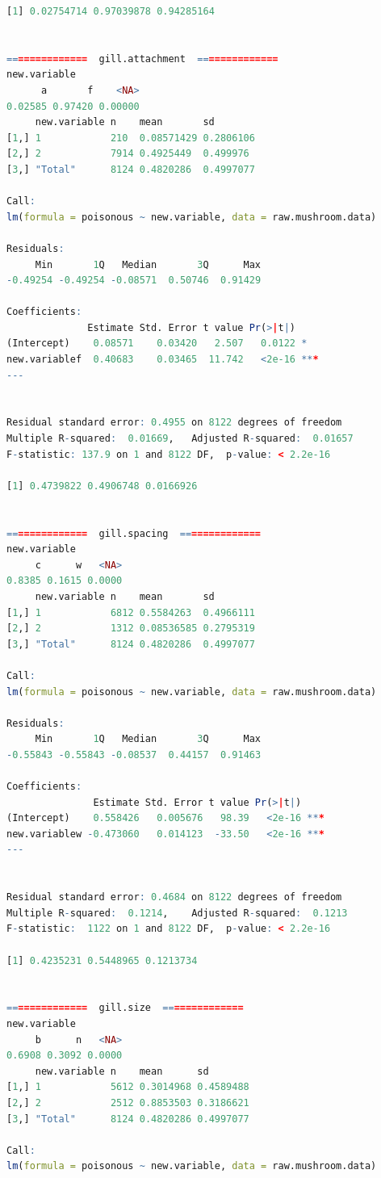 \documentclass[12pt]{article}
\begin{document}
\begin{lstlisting}[language = R]
[1] 0.02754714 0.97039878 0.94285164


==============  gill.attachment  ==============
new.variable
      a       f    <NA> 
0.02585 0.97420 0.00000 
     new.variable n    mean       sd       
[1,] 1            210  0.08571429 0.2806106
[2,] 2            7914 0.4925449  0.499976 
[3,] "Total"      8124 0.4820286  0.4997077

Call:
lm(formula = poisonous ~ new.variable, data = raw.mushroom.data)

Residuals:
     Min       1Q   Median       3Q      Max 
-0.49254 -0.49254 -0.08571  0.50746  0.91429 

Coefficients:
              Estimate Std. Error t value Pr(>|t|)    
(Intercept)    0.08571    0.03420   2.507   0.0122 *  
new.variablef  0.40683    0.03465  11.742   <2e-16 ***
---


Residual standard error: 0.4955 on 8122 degrees of freedom
Multiple R-squared:  0.01669,	Adjusted R-squared:  0.01657 
F-statistic: 137.9 on 1 and 8122 DF,  p-value: < 2.2e-16

[1] 0.4739822 0.4906748 0.0166926


==============  gill.spacing  ==============
new.variable
     c      w   <NA> 
0.8385 0.1615 0.0000 
     new.variable n    mean       sd       
[1,] 1            6812 0.5584263  0.4966111
[2,] 2            1312 0.08536585 0.2795319
[3,] "Total"      8124 0.4820286  0.4997077

Call:
lm(formula = poisonous ~ new.variable, data = raw.mushroom.data)

Residuals:
     Min       1Q   Median       3Q      Max 
-0.55843 -0.55843 -0.08537  0.44157  0.91463 

Coefficients:
               Estimate Std. Error t value Pr(>|t|)    
(Intercept)    0.558426   0.005676   98.39   <2e-16 ***
new.variablew -0.473060   0.014123  -33.50   <2e-16 ***
---


Residual standard error: 0.4684 on 8122 degrees of freedom
Multiple R-squared:  0.1214,	Adjusted R-squared:  0.1213 
F-statistic:  1122 on 1 and 8122 DF,  p-value: < 2.2e-16

[1] 0.4235231 0.5448965 0.1213734


==============  gill.size  ==============
new.variable
     b      n   <NA> 
0.6908 0.3092 0.0000 
     new.variable n    mean      sd       
[1,] 1            5612 0.3014968 0.4589488
[2,] 2            2512 0.8853503 0.3186621
[3,] "Total"      8124 0.4820286 0.4997077

Call:
lm(formula = poisonous ~ new.variable, data = raw.mushroom.data)


\end{lstlisting}
\end{document}
